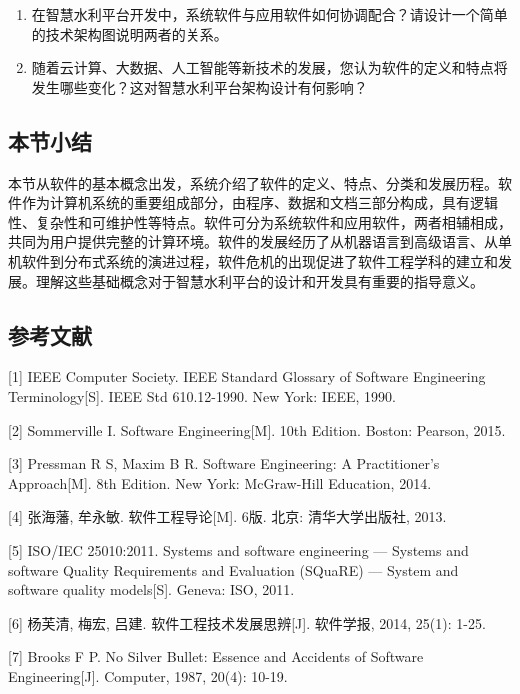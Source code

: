 \begin{enumerate}
\def\labelenumi{\arabic{enumi}.}
\setcounter{enumi}{6}
\tightlist
\item
  在智慧水利平台开发中，系统软件与应用软件如何协调配合？请设计一个简单的技术架构图说明两者的关系。
\item
  随着云计算、大数据、人工智能等新技术的发展，您认为软件的定义和特点将发生哪些变化？这对智慧水利平台架构设计有何影响？
\end{enumerate}

\subsection{本节小结}\label{ux672cux8282ux5c0fux7ed3}

本节从软件的基本概念出发，系统介绍了软件的定义、特点、分类和发展历程。软件作为计算机系统的重要组成部分，由程序、数据和文档三部分构成，具有逻辑性、复杂性和可维护性等特点。软件可分为系统软件和应用软件，两者相辅相成，共同为用户提供完整的计算环境。软件的发展经历了从机器语言到高级语言、从单机软件到分布式系统的演进过程，软件危机的出现促进了软件工程学科的建立和发展。理解这些基础概念对于智慧水利平台的设计和开发具有重要的指导意义。

\subsection{参考文献}\label{ux53c2ux8003ux6587ux732e}

{[}1{]} IEEE Computer Society. IEEE Standard Glossary of Software Engineering Terminology{[}S{]}. IEEE Std 610.12-1990. New York: IEEE, 1990.

{[}2{]} Sommerville I. Software Engineering{[}M{]}. 10th Edition. Boston: Pearson, 2015.

{[}3{]} Pressman R S, Maxim B R. Software Engineering: A Practitioner's Approach{[}M{]}. 8th Edition. New York: McGraw-Hill Education, 2014.

{[}4{]} 张海藩, 牟永敏. 软件工程导论{[}M{]}. 6版. 北京: 清华大学出版社, 2013.

{[}5{]} ISO/IEC 25010:2011. Systems and software engineering --- Systems and software Quality Requirements and Evaluation (SQuaRE) --- System and software quality models{[}S{]}. Geneva: ISO, 2011.

{[}6{]} 杨芙清, 梅宏, 吕建. 软件工程技术发展思辨{[}J{]}. 软件学报, 2014, 25(1): 1-25.

{[}7{]} Brooks F P. No Silver Bullet: Essence and Accidents of Software Engineering{[}J{]}. Computer, 1987, 20(4): 10-19.

